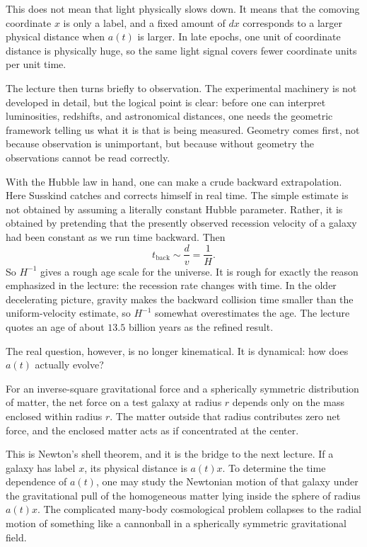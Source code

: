 This does not mean that light physically slows down. It means that the comoving coordinate \(x\) is only a label, and a fixed amount of \(dx\) corresponds to a larger physical distance when \(a(t)\) is larger. In late epochs, one unit of coordinate distance is physically huge, so the same light signal covers fewer coordinate units per unit time.

The lecture then turns briefly to observation. The experimental machinery is not developed in detail, but the logical point is clear: before one can interpret luminosities, redshifts, and astronomical distances, one needs the geometric framework telling us what it is that is being measured. Geometry comes first, not because observation is unimportant, but because without geometry the observations cannot be read correctly.

With the Hubble law in hand, one can make a crude backward extrapolation. Here Susskind catches and corrects himself in real time. The simple estimate is not obtained by assuming a literally constant Hubble parameter. Rather, it is obtained by pretending that the presently observed recession velocity of a galaxy had been constant as we run time backward. Then
\begin{equation}
t_{\mathrm{back}} \sim \frac{d}{v} = \frac{1}{H}.
\end{equation}
So \(H^{-1}\) gives a rough age scale for the universe. It is rough for exactly the reason emphasized in the lecture: the recession rate changes with time. In the older decelerating picture, gravity makes the backward collision time smaller than the uniform-velocity estimate, so \(H^{-1}\) somewhat overestimates the age. The lecture quotes an age of about \(13.5\) billion years as the refined result.

The real question, however, is no longer kinematical. It is dynamical: how does \(a(t)\) actually evolve?

\begin{proposition}
For an inverse-square gravitational force and a spherically symmetric distribution of matter, the net force on a test galaxy at radius \(r\) depends only on the mass enclosed within radius \(r\). The matter outside that radius contributes zero net force, and the enclosed matter acts as if concentrated at the center.
\end{proposition}

This is Newton's shell theorem, and it is the bridge to the next lecture. If a galaxy has label \(x\), its physical distance is \(a(t)x\). To determine the time dependence of \(a(t)\), one may study the Newtonian motion of that galaxy under the gravitational pull of the homogeneous matter lying inside the sphere of radius \(a(t)x\). The complicated many-body cosmological problem collapses to the radial motion of something like a cannonball in a spherically symmetric gravitational field.

